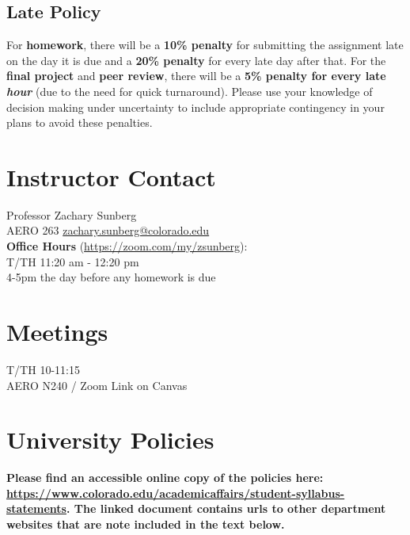 \documentclass[9pt]{article}
\begin{document}
\subsection*{Late Policy}

For \textbf{homework}, there will be a \textbf{10\% penalty} for submitting the assignment late on the day it is due and a \textbf{20\% penalty} for every late day after that. For the \textbf{final project} and \textbf{peer review}, there will be a \textbf{5\% penalty for every late \emph{hour}} (due to the need for quick turnaround). Please use your knowledge of decision making under uncertainty to include appropriate contingency in your plans to avoid these penalties.

\vspace{12pt}
\begin{multicols}{2}
    \begin{minipage}{\columnwidth}
        \section*{Instructor Contact}

        Professor Zachary Sunberg\\
        AERO 263 \href{mailto://zachary.sunberg@colorado.edu}{zachary.sunberg@colorado.edu}\\
        \textbf{Office Hours} (\url{https://zoom.com/my/zsunberg}): \\
        T/TH 11:20 am - 12:20 pm\\
        4-5pm the day before any homework is due
    \end{minipage}

\section*{Meetings}

T/TH 10-11:15\\
AERO N240 / Zoom Link on Canvas

\end{multicols}

\section*{University Policies}

\textbf{Please find an accessible online copy of the policies here: \url{https://www.colorado.edu/academicaffairs/student-syllabus-statements}. The linked document contains urls to other department websites that are note included in the text below.}
\end{document}
